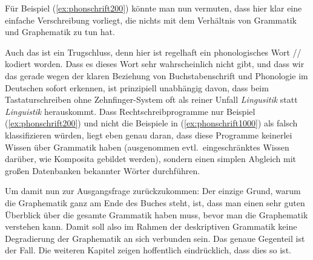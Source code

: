 Für Beispiel (\ref{ex:phonschrift200}) könnte man nun vermuten, dass hier klar eine einfache Verschreibung vorliegt, die nichts mit dem Verhältnis von Grammatik und Graphematik zu tun hat.

\begin{exe}
\end{exe}

Auch das ist ein Trugschluss, denn hier ist regelhaft ein phonologisches Wort // kodiert worden.
Dass es dieses Wort sehr wahrscheinlich nicht gibt, und dass wir das gerade wegen der klaren Beziehung von Buchstabenschrift und Phonologie im Deutschen sofort erkennen, ist prinzipiell unabhängig davon, dass beim Tastaturschreiben ohne Zehnfinger-System oft als reiner Unfall \textit{Lingusitik} statt \textit{Linguistik} herauskommt.
Dass Rechtschreibprogramme nur Beispiel (\ref{ex:phonschrift200}) und nicht die Beispiele in (\ref{ex:phonschrift1000}) als falsch klassifizieren würden, liegt eben genau daran, dass diese Programme keinerlei Wissen über Grammatik haben (ausgenommen evtl.\ eingeschränktes Wissen darüber, wie Komposita gebildet werden), sondern einen simplen Abgleich mit großen Datenbanken bekannter Wörter durchführen.

Um damit nun zur Ausgangsfrage zurückzukommen:
Der einzige Grund, warum die Graphematik ganz am Ende des Buches steht, ist, dass man einen sehr guten Überblick über die gesamte Grammatik haben muss, bevor man die Graphematik verstehen kann.
Damit soll also im Rahmen der deskriptiven Grammatik keine Degradierung der Graphematik an sich verbunden sein.
Das genaue Gegenteil ist der Fall.
Die weiteren Kapitel zeigen hoffentlich eindrücklich, dass dies so ist.

